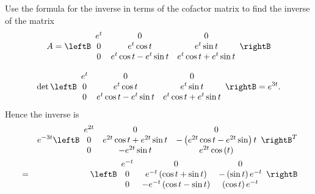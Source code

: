 \begin{enumialphparenastyle}
\begin{ex} Use the formula for the inverse in terms of the cofactor matrix to
find the inverse of the matrix 
\begin{equation*}
A=\leftB
\begin{array}{ccc}
e^{t} & 0 & 0 \\
0 & e^{t}\cos t & e^{t}\sin t \\
0 & e^{t}\cos t-e^{t}\sin t & e^{t}\cos t+e^{t}\sin t
\end{array}
\rightB 
\end{equation*}
\begin{sol}
\[
\det \leftB
\begin{array}{ccc}
e^{t} & 0 & 0 \\
0 & e^{t}\cos t & e^{t}\sin t \\
0 & e^{t}\cos t-e^{t}\sin t & e^{t}\cos t+e^{t}\sin t
\end{array}
\rightB = e^{3t}.
\]
Hence the inverse is
\begin{eqnarray*}
&&e^{-3t}\leftB
\begin{array}{ccc}
e^{2t} & 0 & 0 \\
0 & e^{2t}\cos t+e^{2t}\sin t & -\left( e^{2t}\cos t-e^{2t}\sin \right) t \\
0 & -e^{2t}\sin t & e^{2t}\cos \left( t\right)
\end{array}
\rightB ^{T} \\
&=& \leftB
\begin{array}{ccc}
e^{-t} & 0 & 0 \\
0 & e^{-t}\left( \cos t+\sin t\right)  & -\left( \sin t\right) e^{-t} \\
0 & -e^{-t}\left( \cos t-\sin t\right)  & \left( \cos t\right) e^{-t}
\end{array}
\rightB
\end{eqnarray*}
\end{sol}
\end{ex}


\end{enumialphparenastyle}
